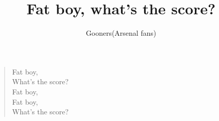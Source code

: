 \documentclass[a4paper,12pt]{article}
\title{Fat boy, what's the score?}
\author{Gooners(Arsenal fans)}
\date{}
\begin{document}
	
	\maketitle
	
	\begin{verse}
		
		Fat boy, \\
		What's the score? \\
		Fat boy, \\
		Fat boy, \\
		What's the score?
		
	\end{verse}
	
\end{document}
